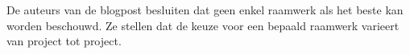 De auteurs van de blogpost besluiten dat geen enkel raamwerk als het beste kan worden beschouwd.
Ze stellen dat de keuze voor een bepaald raamwerk varieert van project tot project.

% 

